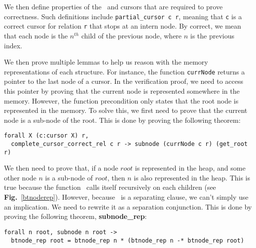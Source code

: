 We then define properties of the \btrees\ and cursors that are required to prove correctness.
Such definitions include \texttt{partial\_cursor c r}, meaning that \texttt{c} is a correct cursor for relation \texttt{r} that stops at an intern node.
By correct, we mean that each node is the $n^{th}$ child of the previous node, where $n$ is the previous index.

We then prove multiple lemmas to help us reason with the memory representations of each structure.
For instance, the function \texttt{currNode} returns a pointer to the last node of a cursor.
In the verification proof, we need to access this pointer by proving that the current node is represented somewhere in the memory.
However, the function precondition only states that the root node is represented in the memory.
To solve this, we first need to prove that the current node is a sub-node of the root.
This is done by proving the following theorem:
\begin{lstlisting}[language=Coq]
  forall X (c:cursor X) r,
  complete_cursor_correct_rel c r -> subnode (currNode c r) (get_root r)
\end{lstlisting}

We then need to prove that, if a node $root$ is represented in the heap, and some other node $n$ is a sub-node of $root$, then $n$ is also represented in the heap.
This is true because the function \btrep\ calls itself recursively on each children (see \textbf{Fig.}~\ref{btnoderep}).
However, because \btrep\ is a separating clause, we can't simply use an implication. We need to rewrite it as a separation conjunction.
This is done by proving the following theorem, \textbf{subnode\_rep}:

\begin{lstlisting}[language=Coq]
  forall n root, subnode n root ->
  btnode_rep root = btnode_rep n * (btnode_rep n -* btnode_rep root)
\end{lstlisting}


